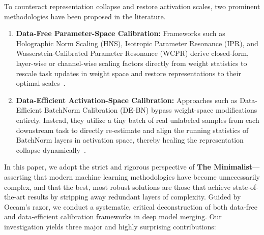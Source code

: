 \documentclass{article}
\begin{document}
To counteract representation collapse and restore activation scales, two prominent methodologies have been proposed in the literature.
\begin{enumerate}
    \item \textbf{Data-Free Parameter-Space Calibration:} Frameworks such as Holographic Norm Scaling (HNS), Isotropic Parameter Resonance (IPR), and Wasserstein-Calibrated Parameter Resonance (WCPR) derive closed-form, layer-wise or channel-wise scaling factors directly from weight statistics to rescale task updates in weight space and restore representations to their optimal scales~\cite{submission5,submission9}.
    \item \textbf{Data-Efficient Activation-Space Calibration:} Approaches such as Data-Efficient BatchNorm Calibration (DE-BN) bypass weight-space modifications entirely. Instead, they utilize a tiny batch of real unlabeled samples from each downstream task to directly re-estimate and align the running statistics of BatchNorm layers in activation space, thereby healing the representation collapse dynamically~\cite{submission10,jordan2023repair}.
\end{enumerate}

In this paper, we adopt the strict and rigorous perspective of \textbf{The Minimalist}---asserting that modern machine learning methodologies have become unnecessarily complex, and that the best, most robust solutions are those that achieve state-of-the-art results by stripping away redundant layers of complexity. Guided by Occam's razor, we conduct a systematic, critical deconstruction of both data-free and data-efficient calibration frameworks in deep model merging. Our investigation yields three major and highly surprising contributions:
\end{document}
